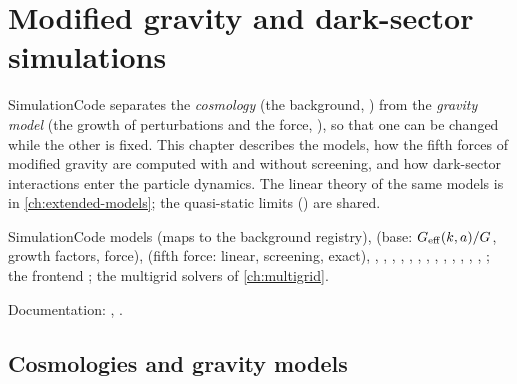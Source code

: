 \chapter{Modified gravity and dark-sector simulations}\label{ch:mg-simulations}

SimulationCode separates the \emph{cosmology} (the background, ) from the \emph{gravity model}
(the growth of perturbations and the force, ), so that one can be changed while the other is
fixed. This chapter describes the models, how the fifth forces of modified gravity are computed with and without
screening, and how dark-sector interactions enter the particle dynamics. The linear theory of the same models is in
\cref{ch:extended-models}; the quasi-static limits () are shared.

\begin{modulebox}{SimulationCode models}
 (maps  to the background registry),  (base:
$G_{\rm eff}(k,a)/G$, growth factors, force),  (fifth force: linear, screening,
exact), , , , , ,
, , , , , ,
, , ; the frontend
; the multigrid solvers of \cref{ch:multigrid}.\par
Documentation: , .
\end{modulebox}

\section{Cosmologies and gravity models}\label{sec:mgsim-models}

